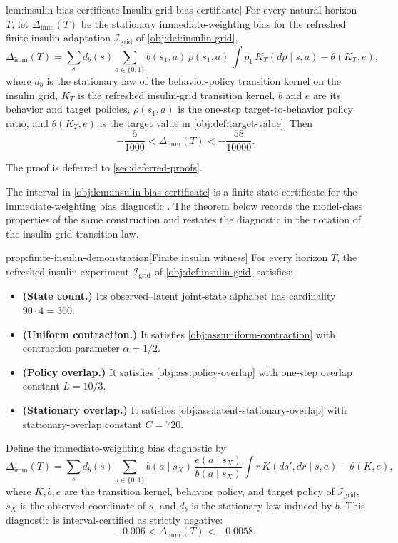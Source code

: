 \documentclass[11pt]{article}
\begin{document}
\begin{lemmav}{lem:insulin-bias-certificate}[Insulin-grid bias certificate]
For every natural horizon \(T\), let \(\Delta_{\mathrm{imm}}(T)\) be the stationary immediate-weighting bias for the refreshed finite insulin adaptation \(\mathcal I_{\mathrm{grid}}\) of \cref{obj:def:insulin-grid},
\[
\Delta_{\mathrm{imm}}(T)
=
\sum_s d_b(s)
\sum_{a\in\{0,1\}}
b(s_1,a)\,
\rho(s_1,a)\,
\int p_1\,K_T(dp\mid s,a)
-
\theta(K_T,e),
\]
where \(d_b\) is the stationary law of the behavior-policy transition kernel on the insulin grid, \(K_T\) is the refreshed insulin-grid transition kernel, \(b\) and \(e\) are its behavior and target policies, \(\rho(s_1,a)\) is the one-step target-to-behavior policy ratio, and \(\theta(K_T,e)\) is the target value in \cref{obj:def:target-value}. Then
\[
-\frac{6}{1000}
<
\Delta_{\mathrm{imm}}(T)
<
-\frac{58}{10000}.
\]
\end{lemmav}

The proof is deferred to \cref{sec:deferred-proofs}.

The interval in \cref{obj:lem:insulin-bias-certificate} is a finite-state certificate for the immediate-weighting bias diagnostic . The theorem below records the model-class properties of the same construction and restates the diagnostic in the notation of the insulin-grid transition law.

\begin{theoremv}{prop:finite-insulin-demonstration}[Finite insulin witness]
For every horizon \(T\), the refreshed insulin experiment \(\mathcal I_{\mathrm{grid}}\) of \cref{obj:def:insulin-grid} satisfies:
\begin{itemize}
\item \textbf{(State count.)} Its observed--latent joint-state alphabet has cardinality \(90\cdot 4=360\).
\item \textbf{(Uniform contraction.)} It satisfies \cref{obj:ass:uniform-contraction} with contraction parameter \(\alpha=1/2\).
\item \textbf{(Policy overlap.)} It satisfies \cref{obj:ass:policy-overlap} with one-step overlap constant \(L=10/3\).
\item \textbf{(Stationary overlap.)} It satisfies \cref{obj:ass:latent-stationary-overlap} with stationary-overlap constant \(C=720\).
\end{itemize}
Define the immediate-weighting bias diagnostic by
\[
\Delta_{\mathrm{imm}}(T)
=
\sum_s d_b(s)\sum_{a\in\{0,1\}} b(a\mid s_X)\,
\frac{e(a\mid s_X)}{b(a\mid s_X)}
\int r\,K(ds',dr\mid s,a)
-
\theta(K,e),
\]
where \(K,b,e\) are the transition kernel, behavior policy, and target policy of \(\mathcal I_{\mathrm{grid}}\), \(s_X\) is the observed coordinate of \(s\), and \(d_b\) is the stationary law induced by \(b\). This diagnostic is interval-certified as strictly negative:
\[
-0.006 < \Delta_{\mathrm{imm}}(T) < -0.0058 .
\]
\end{theoremv}
\end{document}
